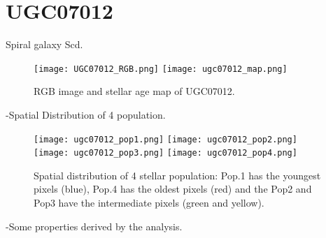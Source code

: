 \newpage
\section*{UGC07012}

Spiral galaxy Scd.

\begin{figure}[bh]
\begin{center}
\texttt{[image: UGC07012\_RGB.png]}
\texttt{[image: ugc07012\_map.png]}
 \caption{RGB image and stellar age map of UGC07012.}
   \label{fig1}
\end{center}
\end{figure}

-Spatial Distribution of 4 population.

\begin{figure}[bh]
\begin{center}
\texttt{[image: ugc07012\_pop1.png]}
\texttt{[image: ugc07012\_pop2.png]}
\texttt{[image: ugc07012\_pop3.png]}
\texttt{[image: ugc07012\_pop4.png]}
 \caption{Spatial distribution of 4 stellar population: Pop.1 has the youngest pixels (blue), Pop.4 has the oldest pixels (red) and the Pop2 and Pop3 have the intermediate pixels (green and yellow).}
   \label{fig1}
\end{center}
\end{figure}



-Some properties derived by the analysis.

